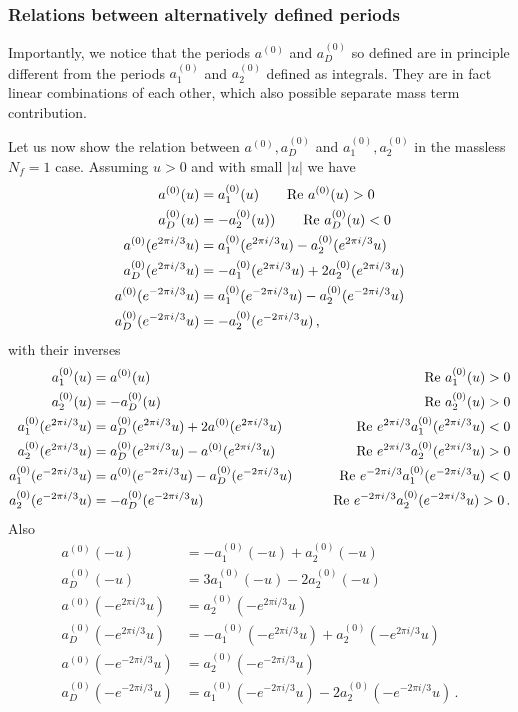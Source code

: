 \documentclass[11pt,a4paper]{elsarticle}
\def \ba {\begin{aligned}}
\def \ea {\end{aligned}}
\newcommand{\be}{\begin{equation}}
\newcommand{\ee}{\end{equation}}
\def\Re{{\rm Re ~}}
\numberwithin{figure}{section}
\numberwithin{table}{section}
\begin{document}
\subsubsection{Relations between alternatively defined periods}

Importantly, we notice that the periods $a^{(0)}$ and $a^{(0)}_D$ so defined are in principle different from the periods $a_1^{(0)}$ and $a_2^{(0)}$ defined as integrals. They are in fact linear combinations of each other, which also possible separate mass term contribution.


Let us now show the relation between $a^{(0)}, a^{(0)}_D$ and $a_1^{(0)},a_2^{(0)}$ in the massless $N_f=1$ case. Assuming $u > 0$ and with small $|u|$ we have
\be 
\ba 
a^{(0)}(u) &= a^{(0)}_1(u)\qquad \Re{a^{(0)}(u)}>0 \\
a^{(0)}_D(u) &=-a^{(0)}_2(u))\qquad \Re{a^{(0)}_D(u)}<0  \\
a^{(0)}(e^{2\pi i/3}u)&= a^{(0)}_1(e^{2\pi i/3}u)-a^{(0)}_2(e^{2\pi i/3}u) \\
a^{(0)}_D(e^{2\pi i/3}u) &= -a^{(0)}_1(e^{2\pi i/3}u)+2a^{(0)}_2(e^{2\pi i/3}u) \\
a^{(0)}(e^{-2\pi i/3}u)&=a^{(0)}_1(e^{-2\pi i/3}u)-a^{(0)}_2(e^{-2\pi i/3}u) \\
a^{(0)}_D(e^{-2\pi i/3}u)&=-a^{(0)}_2(e^{-2\pi i/3}u)\,,
\ea 
\ee
with their inverses
\be 
\ba  \label{a12aaD}
a^{(0)}_1(u) &= a^{(0)}(u)\qquad &\Re{a^{(0)}_1(u)}>0 \\
a^{(0)}_2(u) &= - a^{(0)}_D(u) \qquad &\Re{a^{(0)}_2(u)}>0\\
a^{(0)}_1(e^{2\pi i/3}u) &=  a^{(0)}_D(e^{2\pi i/3} u)+2 a^{(0)} (e^{2\pi i/3}u)\qquad &\Re{e^{2\pi i/3}a^{(0)}_1(e^{2\pi i/3}u)}<0  \\
a^{(0)}_2(e^{2\pi i/3}u) &=  a^{(0)}_D(e^{2\pi i/3} u)- a^{(0)} (e^{2\pi i/3}u)\qquad &\Re{e^{2\pi i/3}a^{(0)}_2(e^{2\pi i/3}u)}>0  \\
a^{(0)}_1(e^{-2\pi i/3}u) &= a^{(0)}(e^{-2\pi i/3}u) - a^{(0)}_D(e^{-2\pi i/3}u)\qquad &\Re{e^{-2\pi i/3}a^{(0)}_1(e^{-2\pi i/3}u)}<0 \\
a^{(0)}_2(e^{-2\pi i/3}u)&=-a^{(0)}_D(e^{-2\pi i/3}u)\qquad &\Re{e^{-2\pi i/3}a^{(0)}_2(e^{-2\pi i/3}u)}>0\,.
\ea
\ee 
Also
\be 
\ba 
a^{(0)}(-u) &= -a^{(0)}_1(-u)+a^{(0)}_2(-u) \\
a^{(0)}_D(-u) &=3a^{(0)}_1(-u)-2a^{(0)}_2(-u) \\
a^{(0)}(-e^{2\pi i/3}u)&= a^{(0)}_2(-e^{2\pi i/3}u)  \\
a^{(0)}_D(-e^{2\pi i/3}u) &=-a^{(0)}_1(-e^{2\pi i/3}u)+a^{(0)}_2(-e^{2\pi i/3}u)   \\
a^{(0)}(-e^{-2\pi i/3}u)&= a^{(0)}_2(-e^{-2\pi i/3}u)  \\
a^{(0)}_D(-e^{-2\pi i/3}u)&= a^{(0)}_1(-e^{-2\pi i/3}u)-2a^{(0)}_2(-e^{-2\pi i/3}u) \,.
\ea 
\ee
\end{document}
